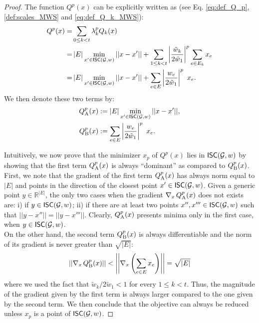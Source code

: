 \begin{proof}
The function $Q^p(x)$ can be explicitly written as (see Eq. \ref{eq:def_Q_p}, \ref{def:scales_MWS} and \ref{eq:def_Q_k_MWS}):
\begin{align}
Q^p(x) =& \sum_{0\leq k< t} \lambda^p_k Q_k (x) \\
= & \, |E| \min_{x' \in \mathsf{ISC}(\mathcal{G},w)} ||x-x'|| + \sum_{1 \leq k < t} \left | \frac{\tilde{w}_k}{2\tilde{w}_1} \right |^p \sum_{e\in E_{k}} x_e  \\
 = & \, |E| \min_{x' \in \mathsf{ISC}(\mathcal{G},w)} ||x-x'|| +  \sum_{e \in E} \left | \frac{w_e}{2\tilde{w}_1} \right |^p \,\,x_e. 
\end{align}
We then denote these two terms by:
\begin{align}
Q_{\textrm{A}}^p(x) &:= |E| \min_{x' \in \mathsf{ISC}(\mathcal{G},w)} ||x-x'||, \\
Q_{\textrm{B}}^p(x) &:= \sum_{e \in E} \left | \frac{w_e}{2\tilde{w}_1} \right |^p \,\,x_e. 
\end{align}

\noindent Intuitively, we now prove that the minimizer $x_p$ of $Q^p(x)$ lies in $\mathsf{ISC}(\mathcal{G},w)$ by showing that the first term $Q_{\textrm{A}}^p(x)$ is always ``dominant'' as compared to $Q_{\textrm{B}}^p(x)$. \\
First, we note that the gradient of the first term $Q_{\textrm{A}}^p(x)$ has always norm equal to $|E|$ and points in the direction of the closest point $x' \in \mathsf{ISC}(\mathcal{G},w)$. Given a generic point $y\in \mathbb{R}^{|E|}$, the only two cases when the gradient $\nabla_x\,Q_{\textrm{A}}^p(x)$ does not exists are: i) if $y \in \mathsf{ISC}(\mathcal{G},w)$; ii) if there are at least two points $x'',x''' \in \mathsf{ISC}(\mathcal{G},w)$ such that $||y-x''||=||y-x'''||$.
Clearly, $Q_{\textrm{A}}^p(x)$ presents minima only in the first case, when \mbox{$y\in \mathsf{ISC}(\mathcal{G},w)$}.\\
On the other hand, the second term $Q_{\textrm{B}}^p(x)$ is always differentiable and the norm of its gradient is never greater than $\sqrt{|E|}$:
\begin{equation}
\left|\left|\nabla_x\,Q_{\textrm{B}}^p(x)\right|\right| < \left|\left| \nabla_x \left(\sum_{e \in E} x_e\right) \right|\right| = \sqrt{|E|}
\end{equation}
where we used the fact that $\tilde{w}_k / 2\tilde{w}_1<1$ for every \mbox{$1\leq k < t$}. 
Thus, the magnitude of the gradient given by the first term is always larger compared to the one given by the second term. We then conclude that the objective can always be reduced unless $x_p$ is a point of $\mathsf{ISC}(\mathcal{G},w)$.
\end{proof}
